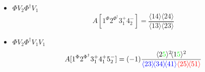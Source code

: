 \documentclass{beamer}
\newcommand{\avg}[1]{\langle #1 \rangle}
\newcommand{\mdavg}[2]{\langle #1 \rangle\!\langle #2 \rangle}
\begin{document}
\begin{frame}
\begin{center}
\begin{tikzpicture}[x=0.75pt,y=0.75pt,yscale=0.8,xscale=0.8]
        \end{tikzpicture}
    \end{center}
    \begin{itemize}
        \item $\Phi V_2 \Phi^\dagger V_1$
        \begin{equation*}
            A[1^\Phi2^{\Phi^\dagger}3_1^+4_2^-]=\frac{\mdavg{14}{24}}{\mdavg{13}{23}}
        \end{equation*}
        \item $\Phi V_2 \Phi^\dagger V_1V_1$
        \begin{equation*}
            A[1^\Phi2^{\Phi^\dagger}3_1^+4_1^+5_2^-]=(-1)\frac{\avg{2\textcolor{green}{5}}^2\!\avg{1\textcolor{green}{5}}^2}{\textcolor{blue}{\mdavg{23}{34}\!\avg{41}}\textcolor{red}{\mdavg{25}{51}}}
        \end{equation*}  
    \end{itemize}
\end{frame}
\end{document}
